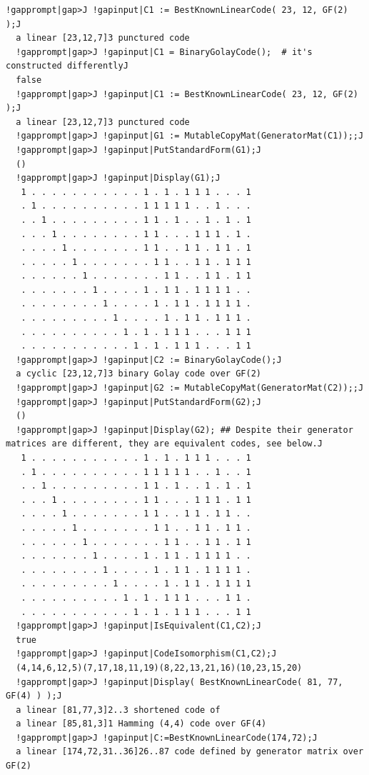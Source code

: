 \documentclass[a4paper,11pt]{report}
\begin{document}
{{ 
\begin{Verbatim}[commandchars=!|J,fontsize=\small,frame=single,label=Example]
  !gapprompt|gap>J !gapinput|C1 := BestKnownLinearCode( 23, 12, GF(2) );J
  a linear [23,12,7]3 punctured code
  !gapprompt|gap>J !gapinput|C1 = BinaryGolayCode();  # it's constructed differentlyJ
  false
  !gapprompt|gap>J !gapinput|C1 := BestKnownLinearCode( 23, 12, GF(2) );J
  a linear [23,12,7]3 punctured code
  !gapprompt|gap>J !gapinput|G1 := MutableCopyMat(GeneratorMat(C1));;J
  !gapprompt|gap>J !gapinput|PutStandardForm(G1);J
  ()
  !gapprompt|gap>J !gapinput|Display(G1);J
   1 . . . . . . . . . . . 1 . 1 . 1 1 1 . . . 1
   . 1 . . . . . . . . . . 1 1 1 1 1 . . 1 . . .
   . . 1 . . . . . . . . . 1 1 . 1 . . 1 . 1 . 1
   . . . 1 . . . . . . . . 1 1 . . . 1 1 1 . 1 .
   . . . . 1 . . . . . . . 1 1 . . 1 1 . 1 1 . 1
   . . . . . 1 . . . . . . . 1 1 . . 1 1 . 1 1 1
   . . . . . . 1 . . . . . . . 1 1 . . 1 1 . 1 1
   . . . . . . . 1 . . . . 1 . 1 1 . 1 1 1 1 . .
   . . . . . . . . 1 . . . . 1 . 1 1 . 1 1 1 1 .
   . . . . . . . . . 1 . . . . 1 . 1 1 . 1 1 1 .
   . . . . . . . . . . 1 . 1 . 1 1 1 . . . 1 1 1
   . . . . . . . . . . . 1 . 1 . 1 1 1 . . . 1 1
  !gapprompt|gap>J !gapinput|C2 := BinaryGolayCode();J
  a cyclic [23,12,7]3 binary Golay code over GF(2)
  !gapprompt|gap>J !gapinput|G2 := MutableCopyMat(GeneratorMat(C2));;J
  !gapprompt|gap>J !gapinput|PutStandardForm(G2);J
  ()
  !gapprompt|gap>J !gapinput|Display(G2); ## Despite their generator matrices are different, they are equivalent codes, see below.J
   1 . . . . . . . . . . . 1 . 1 . 1 1 1 . . . 1
   . 1 . . . . . . . . . . 1 1 1 1 1 . . 1 . . 1
   . . 1 . . . . . . . . . 1 1 . 1 . . 1 . 1 . 1
   . . . 1 . . . . . . . . 1 1 . . . 1 1 1 . 1 1
   . . . . 1 . . . . . . . 1 1 . . 1 1 . 1 1 . .
   . . . . . 1 . . . . . . . 1 1 . . 1 1 . 1 1 .
   . . . . . . 1 . . . . . . . 1 1 . . 1 1 . 1 1
   . . . . . . . 1 . . . . 1 . 1 1 . 1 1 1 1 . .
   . . . . . . . . 1 . . . . 1 . 1 1 . 1 1 1 1 .
   . . . . . . . . . 1 . . . . 1 . 1 1 . 1 1 1 1
   . . . . . . . . . . 1 . 1 . 1 1 1 . . . 1 1 .
   . . . . . . . . . . . 1 . 1 . 1 1 1 . . . 1 1
  !gapprompt|gap>J !gapinput|IsEquivalent(C1,C2);J
  true
  !gapprompt|gap>J !gapinput|CodeIsomorphism(C1,C2);J
  (4,14,6,12,5)(7,17,18,11,19)(8,22,13,21,16)(10,23,15,20)
  !gapprompt|gap>J !gapinput|Display( BestKnownLinearCode( 81, 77, GF(4) ) );J
  a linear [81,77,3]2..3 shortened code of
  a linear [85,81,3]1 Hamming (4,4) code over GF(4)
  !gapprompt|gap>J !gapinput|C:=BestKnownLinearCode(174,72);J
  a linear [174,72,31..36]26..87 code defined by generator matrix over GF(2)

\end{Verbatim}}}
\end{document}
